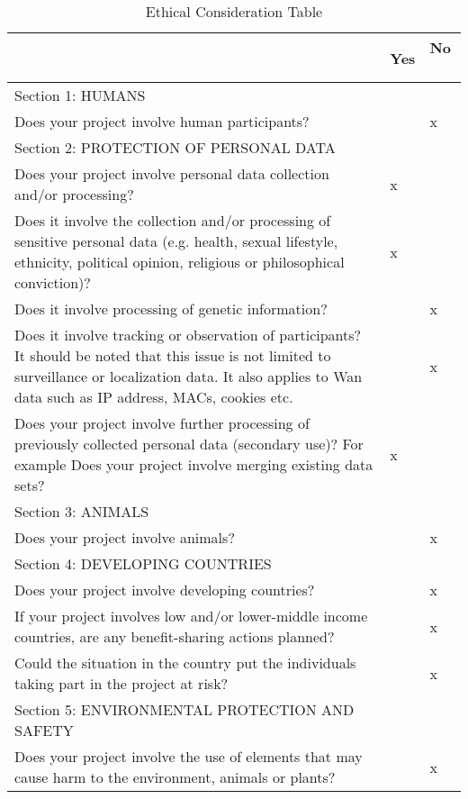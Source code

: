 \begin{center}
    \begin{longtable}{ | m{30em} | m{1.5em} | m{1.5em} | }
    \caption{Ethical Consideration Table}
    \label{tbl:ethical-table}
    \hline
    & Yes & No \ \\ \hline
    \cellcolor[HTML]{C0C0C0} Section 1: HUMANS &  & \  \\ \hline
    Does your project involve human participants? &  & x \\ \hline
    \cellcolor[HTML]{C0C0C0} Section 2: PROTECTION OF PERSONAL DATA &  & \  \\ \hline
    Does your project involve personal data collection and/or processing? & x &  \\ \hline
    Does it involve the collection and/or processing of sensitive personal data (e.g. health, sexual lifestyle, ethnicity, political opinion, religious or philosophical conviction)? & x &  \\ \hline
    Does it involve processing of genetic information? & & x  \\ \hline
    Does it involve tracking or observation of participants? It should be noted that this issue is not limited to surveillance or localization data. It also applies to Wan data such as IP address, MACs, cookies etc. & & x  \\ \hline
    Does your project involve further processing of previously collected personal data (secondary use)? For example Does your project involve merging existing data sets? & x &  \\ \hline
    \cellcolor[HTML]{C0C0C0} Section 3: ANIMALS & & \  \\ \hline
    Does your project involve animals? & & x  \\ \hline
    \cellcolor[HTML]{C0C0C0} Section 4: DEVELOPING COUNTRIES &  & \  \\ \hline
    Does your project involve developing countries? & & x  \\ \hline
    If your project involves low and/or lower-middle income countries, are any benefit-sharing actions planned? & & x  \\ \hline
    Could the situation in the country put the individuals taking part in the project at risk? & & x  \\ \hline
    \cellcolor[HTML]{C0C0C0} Section 5: ENVIRONMENTAL PROTECTION AND SAFETY &  & \  \\ \hline
    Does your project involve the use of elements that may cause harm to the environment, animals or plants? & & x  \\ \hline

\end{longtable}
\end{center}
